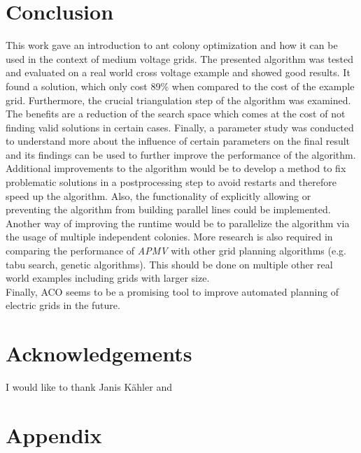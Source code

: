 \chapter{Conclusion}\label{chap:conclusion}
This work gave an introduction to ant colony optimization and how it can be used in the context of medium voltage grids. The presented algorithm was tested and evaluated on a real world cross voltage example and showed good results. It found a solution, which only cost 89\% when compared to the cost of the example grid. Furthermore, the crucial triangulation step of the algorithm was examined. The benefits are a reduction of the search space which comes at the cost of not finding valid solutions in certain cases. Finally, a parameter study was conducted to understand more about the influence of certain parameters on the final result and its findings can be used to further improve the performance of the algorithm. \\

Additional improvements to the algorithm would be to develop a method to fix problematic solutions in a postprocessing step to avoid restarts and therefore speed up the algorithm. Also, the functionality of explicitly allowing or preventing the algorithm from building parallel lines could be implemented. Another way of improving the runtime would be to parallelize the algorithm via the usage of multiple independent colonies. More research is also required in comparing the performance of \textit{APMV} with other grid planning algorithms (e.g. tabu search, genetic algorithms). This should be done on multiple other real world examples including grids with larger size. \\

Finally, ACO seems to be a promising tool to improve automated planning of electric grids in the future. 


\chapter*{Acknowledgements}
\thispagestyle{empty}

I would like to thank Janis Kähler and 

\clearpage



\appendix
\chapter{Appendix}


